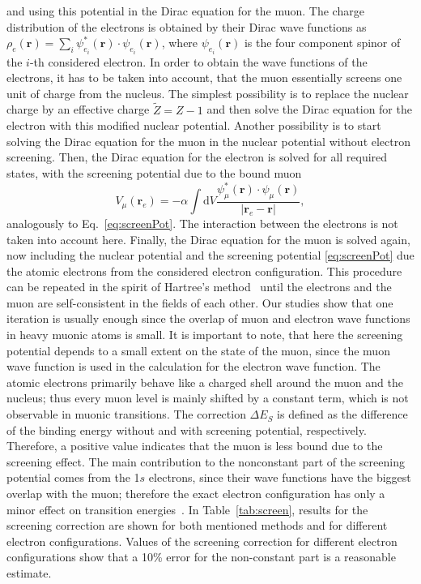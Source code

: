 and using this potential in the Dirac equation for the muon. The charge distribution of the electrons is obtained by their Dirac wave functions as $\rho_e (\mathbf{r})=\sum_i \psi_{e_i}^*(\mathbf{r})\cdot \psi_{e_i}(\mathbf{r})$, where $\psi_{e_i}(\mathbf{r})$  is the four component spinor of the $i$-th considered electron. In order to obtain the wave functions of the electrons, it has to be taken into account, that the muon essentially screens one unit of charge from the nucleus. The simplest possibility is to replace the nuclear charge by an effective charge $\tilde{Z}=Z-1$ and then solve the Dirac equation for the electron with this modified nuclear potential. Another possibility is to start solving the Dirac equation for the muon in the nuclear potential without electron screening. Then, the Dirac equation for the electron is solved for all required states, with the screening potential due to the bound muon
\begin{equation}
V_{\mu}(\mathbf{r}_e)=-\alpha \int \mathrm{d}V\frac{\psi_\mu^*(\mathbf{r})\cdot \psi_\mu(\mathbf{r})}{|\mathbf{r}_e-\mathbf{r}|},
\end{equation}
analogously to Eq.~\eqref{eq:screenPot}.
The interaction between the electrons is not taken into account here. Finally, the Dirac equation for the muon is solved again, now including the nuclear potential and the screening potential \eqref{eq:screenPot} due the atomic electrons from the considered electron configuration. This procedure can be repeated in the spirit of Hartree's method~\cite{bethe_salpeter} until the electrons and the muon are self-consistent in the fields of each other. Our studies show that one iteration is usually enough since the overlap of muon and electron wave functions in heavy muonic atoms is small. It is important to note, that here the screening potential depends to a small extent on the state of the muon, since the muon wave function is used in the calculation for the electron wave function. The atomic electrons primarily behave like a charged shell around the muon and the nucleus; thus every muon level is mainly shifted by a constant term, which is not observable in muonic transitions. The correction $\Delta E_S$ is defined as the difference of the binding energy without and with screening potential, respectively. Therefore, a positive value indicates that the muon is less bound due to the screening effect. The main contribution to the nonconstant part of the screening potential comes from the 1$s$ electrons, since their wave functions have the biggest overlap with the muon; therefore the exact electron configuration has only a minor effect on transition energies~\cite{vogel1973}. In Table~\ref{tab:screen}, results for the screening correction are shown for both mentioned methods and for different electron configurations. Values of the screening correction for different electron configurations show that a 10\% error for the non-constant part is a reasonable estimate.
